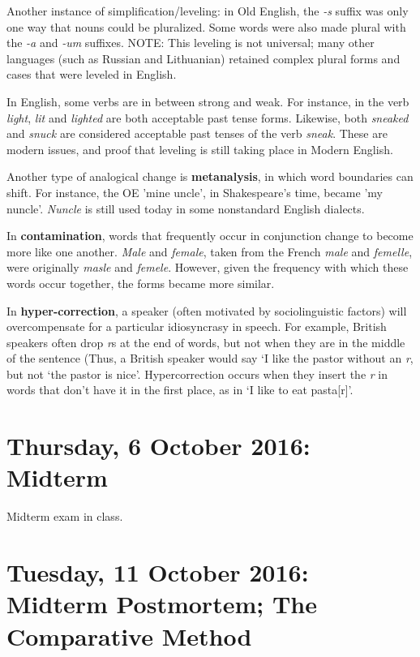 \documentclass{exam}
\begin{document}
Another instance of simplification/leveling: in Old English, the \textit{-s} suffix was only one way that nouns could be pluralized. Some words were also made plural with the \textit{-a} and \textit{-um} suffixes. NOTE: This leveling is not universal; many other languages (such as Russian and Lithuanian) retained complex plural forms and cases that were leveled in English.

In English, some verbs are in between strong and weak. For instance, in the verb \textit{light}, \textit{lit} and \textit{lighted} are both acceptable past tense forms. Likewise, both \textit{sneaked} and \textit{snuck} are considered acceptable past tenses of the verb \textit{sneak}. These are modern issues, and proof that leveling is still taking place in Modern English. 

Another type of analogical change is \textbf{metanalysis}, in which word boundaries can shift. For instance, the OE 'mine uncle', in Shakespeare's time, became 'my nuncle'. \textit{Nuncle} is still used today in some nonstandard English dialects. 

In \textbf{contamination}, words that frequently occur in conjunction change to become more like one another. \textit{Male} and \textit{female}, taken from the French \textit{male} and \textit{femelle}, were originally \textit{masle} and \textit{femele}. However, given the frequency with which these words occur together, the forms became more similar. 

In \textbf{hyper-correction}, a speaker (often motivated by sociolinguistic factors) will overcompensate for a particular idiosyncrasy in speech. For example, British speakers often drop \textit{r}s at the end of words, but not when they are in the middle of the sentence (Thus, a British speaker would say `I like the pastor without an \textit{r}, but not `the pastor is nice'. Hypercorrection occurs when they insert the \textit{r} in words that don't have it in the first place, as in `I like to eat pasta[r]'.

\section*{Thursday, 6 October 2016: Midterm}

Midterm exam in class.

\section*{Tuesday, 11 October 2016: Midterm Postmortem; The Comparative Method}
\end{document}
